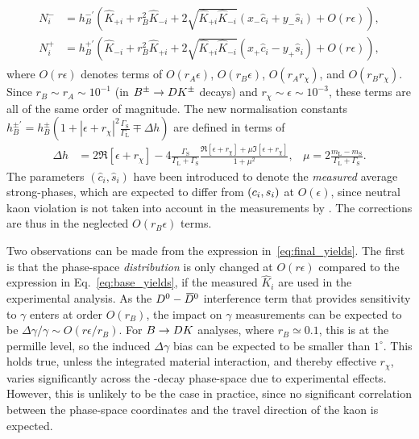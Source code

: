\begin{align}
\begin{split}\label{eq:final_yields}
    N^-_i&= h_B^{-'} \left( \hat K_{+i} + r_B^2\hat K_{-i} + 2 \sqrt{\hat K_{+i} \hat K_{-i}}(x_- \hat c_i + y_- \hat s_i)   + O(r\epsilon) \right),
    \\
    N^+_i&= h_B^{+'} \left(\hat K_{-i} + r_B^2\hat K_{+i} + 2 \sqrt{\hat K_{+i} \hat K_{-i}}(x_+ \hat c_i - y_+ \hat s_i)   + O(r\epsilon) \right),
        \end{split}
\end{align}
where $O(r\epsilon)$ denotes terms of $O(r_{A}\epsilon)$, $O(r_{B}\epsilon)$, $ O(r_{A}r_\chi)$,  and $ O(r_{B}r_\chi)$. Since $r_B \sim r_A \sim 10^{-1}$ (in ${{B}^\pm}\rightarrow{\ensuremath{D}}{\ensuremath{{K}^\pm}}$ decays) and $r_\chi\sim\epsilon \sim 10^{-3}$, these terms are all of the same order of magnitude. The new normalisation constants $h_B^{\pm'}=h_B^{\pm}(1+|\epsilon+r_\chi|^2\frac{\Gamma_\text{S}}{\Gamma_\text{L}}\mp\Delta h)$ are defined in terms of
\begin{align}
        \Delta h &= 2\Re[\epsilon+r_\chi] 
    -4\frac{\Gamma_\text{S}}{\Gamma_\text{L}+\Gamma_\text{S}}\frac{\Re[\epsilon+r_\chi] + \mu \Im[\epsilon+r_\chi] }
    {1+\mu^2}, &
    \mu = 2 \frac{m_\text{L}-m_\text{S}}{\Gamma_\text{L}+\Gamma_\text{S}}.
\end{align}
The parameters $(\hat c_i, \hat s_i)$ have been introduced to denote the \emph{measured} average strong-phases, which are expected to differ from $(c_i,s_i)$ at $O(\epsilon)$, since neutral kaon \CP violation is not taken into account in the measurements by \cleo. The corrections are thus in the neglected $O(r_B\epsilon)$ terms.
 
Two observations can be made from the expression in~\eqref{eq:final_yields}. The first is that the phase-space \emph{distribution} is only changed at $O(r\epsilon)$ compared to the expression in Eq.~\eqref{eq:base_yields}, if the measured $\hat K_i$ are used in the experimental analysis. As the ${{D}^0}-{{\kern 0.18em\overline{\kern -0.18em D}}{}^0}$ interference term that provides sensitivity to $\gamma$ enters at order $O(r_B)$, the impact on $\gamma$ measurements can be expected to be $\Delta\gamma/\gamma\sim O(r\epsilon/r_B)$. For ${B}\rightarrow{\ensuremath{D}} K$ analyses, where $r_B\simeq0.1$, this is at the permille level, so the induced $\Delta\gamma$ bias can be expected to be smaller than $1^\circ$. This holds true, unless the integrated material interaction, and thereby effective $r_\chi$, varies significantly across the \D-decay phase-space due to experimental effects. However, this is unlikely to be the case in practice, since no significant correlation between the phase-space coordinates and the travel direction of the kaon is expected. 

